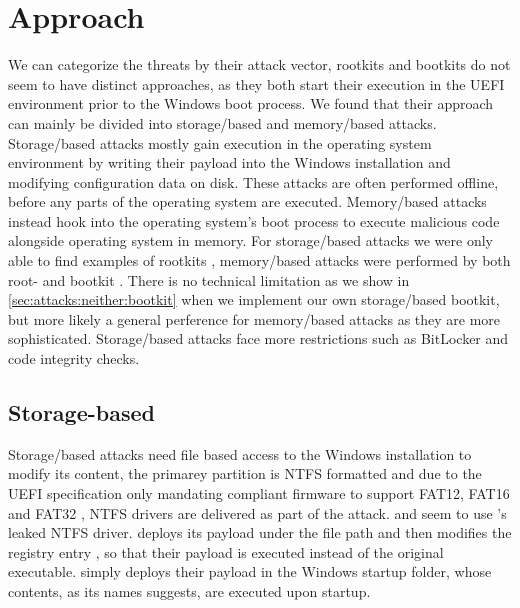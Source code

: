 \section{Approach}

We can categorize the threats by their attack vector, rootkits and bootkits do not seem to have distinct approaches, as they both start their execution in the \ac{UEFI} environment prior to the Windows boot process.
We found that their approach can mainly be divided into storage\-/based and memory\-/based attacks.
Storage\-/based attacks mostly gain execution in the operating system  environment by writing their payload into the Windows installation and modifying configuration data on disk. These attacks are often performed offline, before any parts of the operating system are executed. Memory\-/based attacks instead hook into the operating system's boot process to execute malicious code alongside operating system in memory. For storage\-/based attacks we were only able to find examples of rootkits \cite{vector-edk,mosaicregressor,lojax}, memory\-/based attacks were performed by both root- and bootkit \cite{dreamboot,efiguard,especter,finspy,moonbounce,cosmicstrand}.
There is no technical limitation as we show in \autoref{sec:attacks:neither:bootkit} when we implement our own storage\-/based bootkit, but more likely a general perference for memory\-/based attacks as they are more sophisticated. Storage\-/based attacks face more restrictions such as BitLocker and code integrity checks.

\subsection{Storage-based}

Storage\-/based attacks need file based access to the Windows installation to modify its content, the primarey partition is \ac{NTFS} formatted and due to the \ac{UEFI} specification only mandating compliant firmware to support \ac{FAT}12, \ac{FAT}16 and \ac{FAT}32 \cite[Section 13.3.1.1]{uefi-spec}, \ac{NTFS} drivers are delivered as part of the attack. \cite{mosaicregressor} and \cite{lojax} seem to use \cite{vector-edk}'s leaked \ac{NTFS} driver. \cite{lojax} deploys its payload under the file path  and then modifies the registry entry , so that their payload is executed instead of the original executable. \cite{mosaicregressor} simply deploys their payload in the Windows startup folder, whose contents, as its names suggests, are executed upon startup.

